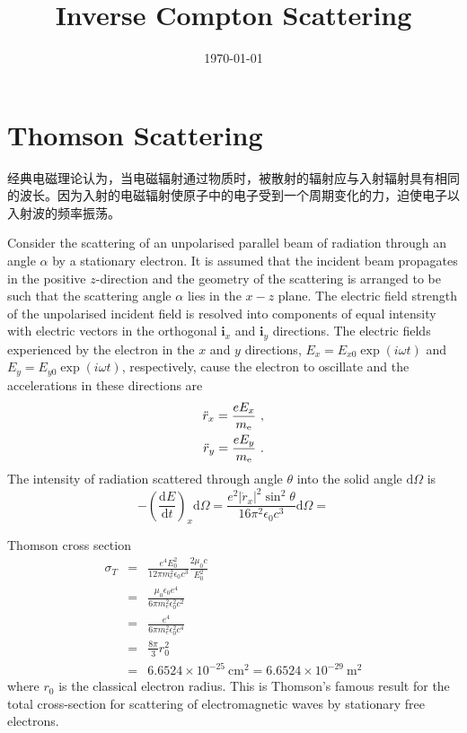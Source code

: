 \documentclass[12pt,a4paper]{article}
\title{Inverse Compton Scattering}
\author{}
\date{\today}
\renewcommand{\vec}[1]{\boldsymbol{#1}}
\newcommand{\dif}{\mathrm{d}}
\begin{document}
\maketitle

\section{Thomson Scattering}
经典电磁理论认为，当电磁辐射通过物质时，被散射的辐射应与入射辐射具有相同的波长。因为入射的电磁辐射使原子中的电子受到一个周期变化的力，迫使电子以入射波的频率振荡。

\cite{2011hea..book.....L} Consider the scattering of an unpolarised parallel beam of radiation through an angle $\alpha$ by a stationary electron. It is assumed that the incident beam propagates in the positive $z$-direction and the geometry of the scattering is arranged to be such that the scattering angle $\alpha$ lies in the $x-z$ plane. The electric field strength of the unpolarised incident field is resolved into components of equal intensity with electric vectors in the orthogonal $\vec{i}_x$ and $\vec{i}_y$ directions. The electric fields experienced by the electron in the $x$ and $y$ directions, $E_x = E_{x0} \exp(i\omega t)$ and $E_y = E_{y0} \exp(i\omega t)$, respectively, cause the electron to oscillate and the accelerations in these directions are 
\begin{align}
\ddot{r}_x = \dfrac{eE_x}{m_{\rm e} } ~, \\
\ddot{r}_y = \dfrac{eE_y}{m_{\rm e} } ~.
\end{align}
The intensity of radiation scattered through angle $\theta$ into the solid angle $\dif \Omega$  is
\begin{equation}
-\left(\frac{\dif E}{\dif t} \right)_x \dif \Omega = \dfrac{e^2 |\ddot{r}_x|^2 \sin^2 \theta}{16 \pi^2 \epsilon_0 c^3} \dif \Omega = 
\end{equation}



Thomson cross section
\begin{eqnarray*}
\sigma_T &=& \frac{e^4 E_0^2}{12 \pi m_e^2 \epsilon_0 c^3} \frac{2 \mu_0 c}{E_0^2} \\
&=& \frac{\mu_0 \epsilon_0 e^4}{6\pi  m_e^2 \epsilon_0^2 c^2} \\
&=& \frac{e^4}{6\pi  m_e^2 \epsilon_0^2 c^4} \\
&=& \frac{8\pi}{3} r_0^2 \\
&=& 6.6524 \times 10^{-25} ~\text{cm}^2 =  6.6524 \times 10^{-29} ~\text{m}^2
\end{eqnarray*}
where $r_0$ is the classical electron radius. This is Thomson's famous result for the total cross-section for scattering of electromagnetic waves by stationary free electrons.
\end{document}
